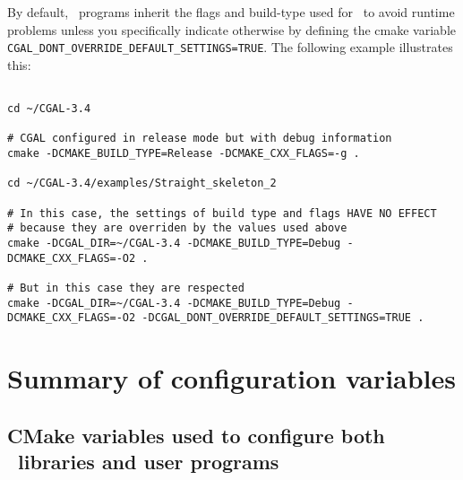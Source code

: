 By default, \cgal\ programs inherit the flags and build-type used
for \cgal\ to avoid runtime problems unless you specifically indicate otherwise by
defining the cmake variable {\tt CGAL\_DONT\_OVERRIDE\_DEFAULT\_SETTINGS=TRUE}.
The following example illustrates this:

{\ccTexHtml{\scriptsize}{}
\begin{verbatim}

cd ~/CGAL-3.4

# CGAL configured in release mode but with debug information 
cmake -DCMAKE_BUILD_TYPE=Release -DCMAKE_CXX_FLAGS=-g .

cd ~/CGAL-3.4/examples/Straight_skeleton_2

# In this case, the settings of build type and flags HAVE NO EFFECT
# because they are overriden by the values used above
cmake -DCGAL_DIR=~/CGAL-3.4 -DCMAKE_BUILD_TYPE=Debug -DCMAKE_CXX_FLAGS=-O2 . 

# But in this case they are respected
cmake -DCGAL_DIR=~/CGAL-3.4 -DCMAKE_BUILD_TYPE=Debug -DCMAKE_CXX_FLAGS=-O2 -DCGAL_DONT_OVERRIDE_DEFAULT_SETTINGS=TRUE . 

\end{verbatim}
}

\section{Summary of configuration variables}

\subsection{CMake variables used to configure both \cgal\ libraries and user programs}

